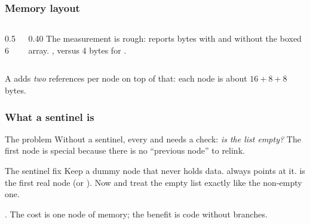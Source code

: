 \documentclass[aspectratio=169,10pt,compress]{beamer}
\begin{document}
\begin{frame}[t,fragile] \frametitle{Memory layout}
  \begin{columns}[T]
    \begin{column}{0.56\textwidth}
    \end{column}
    \begin{column}{0.40\textwidth}
      \small
      The measurement is rough:  reports bytes with
      and without the boxed array. ,
      versus 4 bytes for .
    \end{column}
  \end{columns}
  \vspace{0.3em}
  \small
  A  adds \emph{two} references per node on
  top of that: each node is about $16 + 8 + 8$ bytes.
\end{frame}





\begin{frame}[t,fragile] \frametitle{What a sentinel is}
  \begin{block}{The problem}
    \small
    Without a sentinel, every  and 
    needs a check: \emph{is the list empty?} The first node is special
    because there is no ``previous node'' to relink.
  \end{block}
  \begin{block}{The sentinel fix}
    \small
    Keep a dummy node that never holds data.  always points
    at it.  is the first real node (or ).
    Now  and  treat the empty list
    exactly like the non-empty one.
  \end{block}
  \vspace{0.2em}
  \small
  .
  The cost is one node of memory; the benefit is code without branches.
\end{frame}
\end{document}
